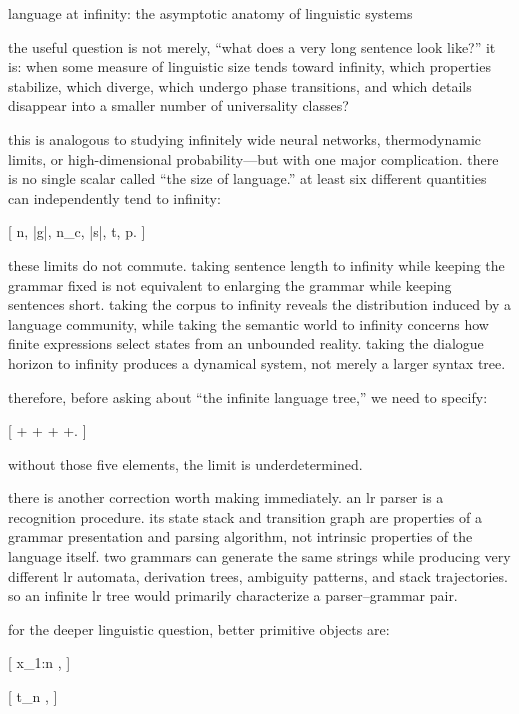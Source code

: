 language at infinity: the asymptotic anatomy of linguistic systems

the useful question is not merely, “what does a very long sentence look like?” it is: when some measure of linguistic size tends toward infinity, which properties stabilize, which diverge, which undergo phase transitions, and which details disappear into a smaller number of universality classes?

this is analogous to studying infinitely wide neural networks, thermodynamic limits, or high-dimensional probability—but with one major complication. there is no single scalar called “the size of language.” at least six different quantities can independently tend to infinity:

[
n,\quad
{}|g|,\quad
{}n_c,\quad
{}|s|,\quad
{}t,\quad
{}p.
]

these limits do not commute. taking sentence length to infinity while keeping the grammar fixed is not equivalent to enlarging the grammar while keeping sentences short. taking the corpus to infinity reveals the distribution induced by a language community, while taking the semantic world to infinity concerns how finite expressions select states from an unbounded reality. taking the dialogue horizon to infinity produces a dynamical system, not merely a larger syntax tree.

therefore, before asking about “the infinite language tree,” we need to specify:

[
+
+
+
+.
]

without those five elements, the limit is underdetermined.

there is another correction worth making immediately. an lr parser is a recognition procedure. its state stack and transition graph are properties of a grammar presentation and parsing algorithm, not intrinsic properties of the language itself. two grammars can generate the same strings while producing very different lr automata, derivation trees, ambiguity patterns, and stack trajectories. so an infinite lr tree would primarily characterize a parser–grammar pair.

for the deeper linguistic question, better primitive objects are:

[
x_{1:n} \quad {},
]

[
t_n \quad {},
]

